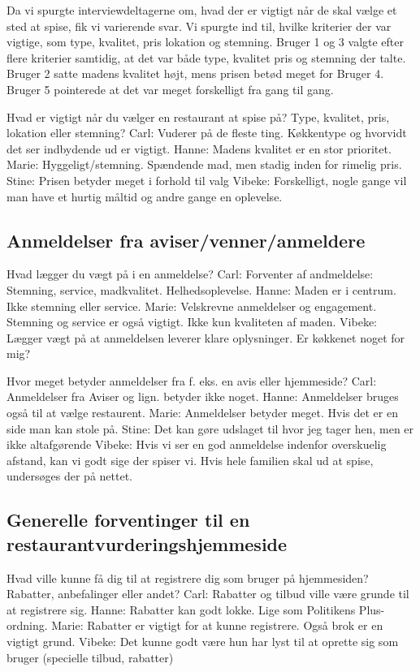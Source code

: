 \documentclass[a4paper, 12pt]{article}
\begin{document}
Da vi spurgte interviewdeltagerne om, hvad der er vigtigt når de skal vælge et
sted at spise, fik vi varierende svar. Vi spurgte ind til, hvilke kriterier
der var vigtige, som type, kvalitet, pris lokation og stemning. Bruger 1 og 3
valgte efter flere kriterier samtidig, at det var både type, kvalitet
pris og stemning der talte. Bruger 2 satte madens kvalitet højt, mens prisen
betød meget for Bruger 4. Bruger 5 pointerede at det var meget forskelligt fra
gang til gang.

  Hvad er vigtigt når du vælger en restaurant at spise på?
  Type, kvalitet, pris, lokation eller stemning?
    Carl: Vuderer på de fleste ting. Køkkentype og hvorvidt det ser indbydende ud er vigtigt.
    Hanne: Madens kvalitet er en stor prioritet.
    Marie: Hyggeligt/stemning. Spændende mad, men stadig inden for rimelig pris.
    Stine: Prisen betyder meget i forhold til valg
    Vibeke: Forskelligt, nogle gange vil man have et hurtig måltid og andre gange en oplevelse.

\subsection{Anmeldelser fra aviser/venner/anmeldere}

  Hvad lægger du vægt på i en anmeldelse?
    Carl: Forventer af andmeldelse: Stemning, service, madkvalitet. Helhedsoplevelse.
    Hanne: Maden er i centrum. Ikke stemning eller service.
    Marie: Velskrevne anmeldelser og engagement. 
	   Stemning og service er også vigtigt. Ikke kun kvaliteten af maden.
    Vibeke: Lægger vægt på at anmeldelsen leverer klare oplysninger. Er køkkenet noget for
	    mig?

  Hvor meget betyder anmeldelser fra f. eks. en avis eller hjemmeside?
    Carl: Anmeldelser fra Aviser og lign. betyder ikke noget.
    Hanne: Anmeldelser bruges også til at vælge restaurent.
    Marie: Anmeldelser betyder meget. Hvis det er en side man kan stole på.
    Stine: Det kan gøre udslaget til hvor jeg tager hen, men er ikke altafgørende
    Vibeke: Hvis vi ser en god anmeldelse indenfor overskuelig afstand, kan vi godt sige der
	    spiser vi. Hvis hele familien skal ud at spise, undersøges der på nettet.

\subsection{Generelle forventinger til en restaurantvurderingshjemmeside}

  Hvad ville kunne få dig til at registrere dig som bruger på hjemmesiden?
  Rabatter, anbefalinger eller andet?
    Carl: Rabatter og tilbud ville være grunde til at registrere sig.
    Hanne: Rabatter kan godt lokke. Lige som Politikens Plus-ordning.
    Marie: Rabatter er vigtigt for at kunne registrere. Også brok er en vigtigt grund.
    Vibeke: Det kunne godt være hun har lyst til at oprette sig som bruger (specielle
	    tilbud, rabatter)
\end{document}

